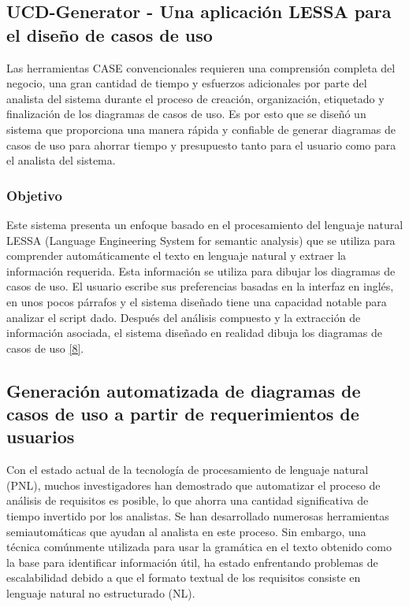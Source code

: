 \subsection{UCD-Generator - Una aplicación LESSA para el diseño de casos de uso}

Las herramientas CASE convencionales requieren una comprensión completa del negocio, una gran cantidad de tiempo y esfuerzos adicionales por parte del analista del sistema durante el proceso de creación, organización, etiquetado y finalización de los diagramas de casos de uso. Es por esto que se diseñó un sistema que proporciona una manera rápida y confiable de generar diagramas de casos de uso para ahorrar tiempo y presupuesto tanto para el usuario como para el analista del sistema.

\subsubsection{Objetivo}
Este sistema presenta un enfoque basado en el procesamiento del lenguaje natural LESSA (Language Engineering System for semantic analysis) que se utiliza para comprender automáticamente el texto en lenguaje natural y extraer la información requerida. Esta información se utiliza para dibujar los diagramas de casos de uso. El usuario escribe sus preferencias basadas en la interfaz en inglés, en unos pocos párrafos y el sistema diseñado tiene una capacidad notable para analizar el script dado. Después del análisis compuesto y la extracción de información asociada, el sistema diseñado en realidad dibuja los diagramas de casos de uso \hyperlink{b08}{[8]}.  

\subsection{Generación automatizada de diagramas de casos de uso a partir de requerimientos de usuarios}

Con el estado actual de la tecnología de procesamiento de lenguaje natural (PNL), muchos investigadores han demostrado que automatizar el proceso de análisis de requisitos es posible, lo que ahorra una cantidad significativa de tiempo invertido por los analistas. Se han desarrollado numerosas herramientas semiautomáticas que ayudan al analista en este proceso. Sin embargo, una técnica comúnmente utilizada para usar la gramática en el texto obtenido como la base para identificar información útil, ha estado enfrentando problemas de escalabilidad debido a que el formato textual de los requisitos consiste en lenguaje natural no estructurado (NL). 

